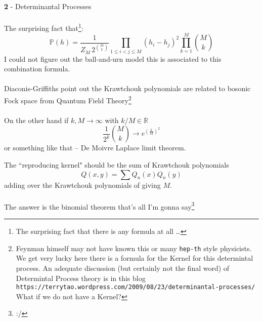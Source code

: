 \documentclass[12pt]{article}
\begin{document}
\noindent \textbf{2} - Determinantal Processes \\ \\
The surprising fact that\footnote{The surprising fact that there is any formula at all \dots}:
$$ \mathbb{P}(h)
= \frac{1}{Z_M \, 2^{\binom{M}{2}}} \prod_{1 \leq i < j \leq M}
(h_i - h_j)^2 \prod_{k=1}^M
\binom{M}{k}
 $$
I could not figure out the ball-and-urn model this is associated to this combination formula. \\ \\
Diaconis-Griffiths point out the Krawtchouk polynomials are related to bosonic Fock space from Quantum Field Theory\footnote{Feynman himself may not have known this or many \texttt{hep-th} style physicists.  We get very lucky here there is a formula for the Kernel for this determintal process.  An adequate discussion (but certainly not the final word) of Determintal Process theory is in this blog \texttt{https://terrytao.wordpress.com/2009/08/23/determinantal-processes/}  What if we do not have a Kernel?   } \\ \\
On the other hand if $k, M \to \infty$ with $k/M \in \mathbb{R}$ 
$$ \frac{1}{2^k} \binom{M}{k} \to e^{(\frac{k}{M})^2}$$
or something like that -- De Moivre Laplace limit theorem. \newpage

\noindent The ``reproducing kernel" should be the sum of Krawtchouk polynomials
$$ Q(x,y) = \sum Q_n(x) Q_n(y)$$
adding over the Krawtchouk polynomials of giving $M$.  \\ \\ 
The answer is the binomial theorem that's all I'm gonna say\footnote{:/}

\newpage

\selectfont \fontsize{12}{10}\selectfont
\end{document}

